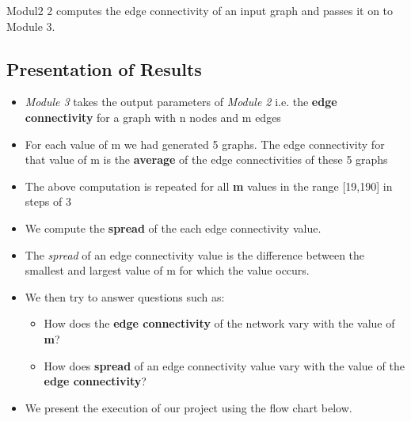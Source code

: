 \documentclass[12pt,letterpaper,titlepage,en-US]{article}
\begin{document}
Modul2 2 computes the edge connectivity of an input graph and passes it on to Module 3.




\subsection{Presentation of Results}
\begin{itemize}

\item \textit{Module 3} takes the output parameters of \textit{Module 2} i.e. the \textbf{edge connectivity} for a graph with n nodes and m edges

\item For each value of m we had generated 5 graphs. The edge connectivity for that value of m is the \textbf{average} of the edge connectivities of these 5 graphs

 \item The above computation is repeated for all \textbf{m} values in the range [19,190] in steps of 3

\item We compute the \textbf{spread} of the each edge connectivity value. 

\item The \textit{spread} of an edge connectivity value is the difference between the smallest and largest value of m for which the value occurs.
 

 
\item We then try to answer questions such as:
\begin{itemize}
\item How does the \textbf{edge connectivity} of the network vary with the value of \textbf{m}?
\item How does \textbf{spread} of an edge connectivity value vary with the value of the \textbf{edge connectivity}? 
\end{itemize}




\item We present the execution of our project using the flow chart below.\\


\end{itemize}
\end{document}
